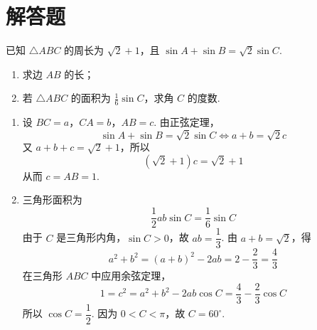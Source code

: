 \section{解答题}

\begin{problem}
已知 \(\triangle ABC\) 的周长为 \(\sqrt{2} + 1\)，且 \(\sin A + \sin B = \sqrt{2} \sin C\).

\begin{enumerate}
\item 求边 \(AB\) 的长；
\item 若 \(\triangle ABC\) 的面积为 \(\frac{1}{6}\sin C\)，求角 \(C\) 的度数.
\end{enumerate}

\begin{solution}
\begin{enumerate}
\item 设 \(BC=a\)，\(CA=b\)，\(AB=c\). 由正弦定理，
\[
\sin A+\sin B=\sqrt{2}\sin C
\Longleftrightarrow a+b=\sqrt{2}c
\]
又 \(a+b+c=\sqrt{2}+1\)，所以
\[
(\sqrt{2}+1)c=\sqrt{2}+1
\]
从而 \(c=AB=1\).
\item 三角形面积为
\[
\frac12ab\sin C=\frac16\sin C
\]
由于 \(C\) 是三角形内角，\(\sin C>0\)，故 \(ab=\dfrac13\). 由 \(a+b=\sqrt{2}\)，得
\[
a^2+b^2=(a+b)^2-2ab=2-\frac23=\frac43
\]
在三角形 \(ABC\) 中应用余弦定理，
\[
1=c^2=a^2+b^2-2ab\cos C
=\frac43-\frac23\cos C
\]
所以 \(\cos C=\dfrac12\). 因为 \(0<C<\pi\)，故 \(C=60^{\circ}\).
\end{enumerate}
\end{solution}
\end{problem}

